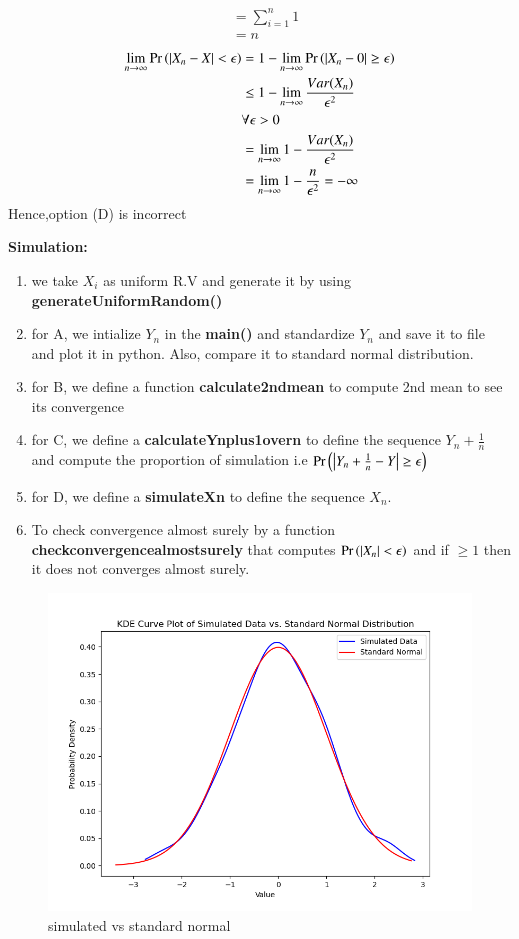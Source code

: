 \documentclass[journal,12pt,Twocolumn]{IEEEtran}
\theoremstyle{remark}
\begin{document}
\begin{enumerate}[label=(\Alph*)]
\begin{align}
&= \sum_{i=1}^{n} 1\\
&= n
\end{align}
\begin{align}
\lim_{n \to \infty} \Pr\left(|X_n - X| <  \epsilon\right)
&=1 - \lim_{n \to \infty} \Pr\left(|X_n-0| \geq  \epsilon\right) \\ 
&\leq 1 - \lim_{n \to \infty} \frac{Var(X_n)}{\epsilon^2} \\
& \forall \epsilon > 0 \\
&=\lim_{n \to \infty} 1 - \frac{Var(X_n)}{\epsilon^2} \\
&=\lim_{n \to \infty} 1 - \frac{n}{\epsilon^2} = -\infty
\end{align} 
Hence,option (D) is incorrect
\end{enumerate}
\textbf{Simulation:}
\begin{enumerate}
\item we take $X_i$ as uniform R.V and generate it by using \textbf{generateUniformRandom()}
\item for A, we intialize $Y_n$ in the \textbf{main()} and standardize $Y_n$ and save it to file and plot it in python. Also, compare it to standard normal distribution.
\item for B, we define a function \textbf{calculate2ndmean} to compute 2nd mean to see its convergence
\item for C, we define a \textbf{calculateYnplus1overn} to define the sequence $Y_n + \frac{1}{n}$ and compute the proportion of simulation i.e $\Pr\left(\left|Y_n +\frac{1}{n}-Y\right| \geq  \epsilon\right)$
\item for D, we define a \textbf{simulateXn} to define the sequence $X_n$. \item To check convergence almost surely by a function \textbf{checkconvergencealmostsurely} that computes $\Pr\left(|X_n| < \epsilon\right)$ and if $ \geq 1 $ then it does not converges almost surely.
\end{enumerate}
\begin{figure}[!ht]
\centering
\includegraphics[width=\columnwidth]{2023/ST/57/codes/sim.png}
\caption{simulated vs standard normal }
\label{fig:57.2023/F/Fig1}
\end{figure}
\end{document}
